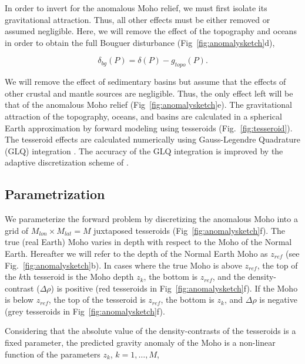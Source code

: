 \documentclass[extra]{gji}
\begin{document}
In order to invert for the anomalous Moho relief,
we must first isolate its gravitational attraction.
Thus, all other effects
must be either removed or assumed negligible.
Here, we will remove the effect of the topography and oceans
in order to obtain the full Bouguer disturbance
(Fig~\ref{fig:anomalysketch}d),

\begin{equation}
    \delta_{bg}(P) = \delta(P) - g_{topo}(P).
    \label{eq:bouguer}
\end{equation}

\noindent
We will remove the effect of sedimentary basins
but assume that the effects of
other crustal and mantle sources are negligible.
Thus, the only effect left will be that of the anomalous Moho relief
(Fig~\ref{fig:anomalysketch}e).
The gravitational attraction of the topography, oceans, and basins are
calculated in a spherical Earth approximation by forward modeling using
tesseroids (Fig.~\ref{fig:tesseroid}).
The tesseroid effects are calculated numerically using
Gauss-Legendre Quadrature (GLQ) integration \citep{asgharzadeh2007}.
The accuracy of the GLQ integration is improved by the adaptive discretization
scheme of \citet{uieda2016}.




\subsection{Parametrization}

We parameterize the forward problem by discretizing the anomalous Moho
into a grid of $M_{lon} \times M_{lat} = M$ juxtaposed tesseroids
(Fig~\ref{fig:anomalysketch}f).
The true (real Earth) Moho varies in depth
with respect to the Moho of the Normal Earth.
Hereafter we will refer to the depth of the Normal Earth Moho as $z_{ref}$
(see Fig.~\ref{fig:anomalysketch}b).
In cases where the true Moho is above $z_{ref}$,
the top of the $k$th tesseroid is the Moho depth $z_{k}$,
the bottom is $z_{ref}$, and the density-contrast ($\Delta\rho$) is positive
(red tesseroids in Fig~\ref{fig:anomalysketch}f).
If the Moho is below $z_{ref}$, the top of the tesseroid is $z_{ref}$,
the bottom is $z_k$, and $\Delta\rho$ is negative
(grey tesseroids in Fig~\ref{fig:anomalysketch}f).

Considering that the absolute value of the density-contrasts
of the tesseroids is a fixed parameter,
the predicted gravity anomaly of the Moho is a non-linear function of the
parameters $z_k$, $k=1, \ldots, M$,
\end{document}

